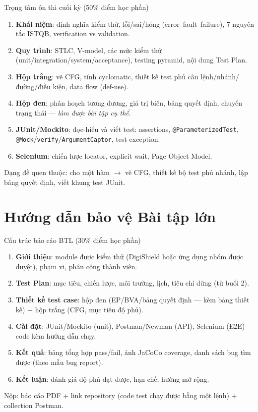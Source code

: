 \documentclass[aspectratio=169,12pt]{beamer}
\begin{document}
\begin{frame}{Trọng tâm ôn thi cuối kỳ (50\% điểm học phần)}
  \vspace*{-0.5em}
  \begin{enumerate}
    \item \textbf{Khái niệm}: định nghĩa kiểm thử, lỗi/sai/hỏng (error--fault--failure), 7 nguyên tắc ISTQB, verification vs validation.
    \item \textbf{Quy trình}: STLC, V-model, các mức kiểm thử (unit/integration/system/acceptance), testing pyramid, nội dung Test Plan.
    \item \textbf{Hộp trắng}: vẽ CFG, tính cyclomatic, thiết kế test phủ câu lệnh/nhánh/đường/điều kiện, data flow (def-use).
    \item \textbf{Hộp đen}: phân hoạch tương đương, giá trị biên, bảng quyết định, chuyển trạng thái --- \emph{làm được bài tập cụ thể}.
    \item \textbf{JUnit/Mockito}: đọc-hiểu và viết test: assertions, \texttt{@ParameterizedTest}, \texttt{@Mock}/\texttt{verify}/\texttt{ArgumentCaptor}, test exception.
    \item \textbf{Selenium}: chiến lược locator, explicit wait, Page Object Model.
  \end{enumerate}
  \small Dạng đề quen thuộc: cho một hàm $\rightarrow$ vẽ CFG, thiết kế bộ test phủ nhánh, lập bảng quyết định, viết khung test JUnit.
\end{frame}

\section{Hướng dẫn bảo vệ Bài tập lớn}

\begin{frame}{Cấu trúc báo cáo BTL (30\% điểm học phần)}
  \begin{enumerate}
    \item \textbf{Giới thiệu}: module được kiểm thử (DigiShield hoặc ứng dụng nhóm được duyệt), phạm vi, phân công thành viên.
    \item \textbf{Test Plan}: mục tiêu, chiến lược, môi trường, lịch, tiêu chí dừng (từ buổi 2).
    \item \textbf{Thiết kế test case}: hộp đen (EP/BVA/bảng quyết định --- kèm bảng thiết kế) + hộp trắng (CFG, mục tiêu độ phủ).
    \item \textbf{Cài đặt}: JUnit/Mockito (unit), Postman/Newman (API), Selenium (E2E) --- code kèm hướng dẫn chạy.
    \item \textbf{Kết quả}: bảng tổng hợp pass/fail, ảnh JaCoCo coverage, danh sách bug tìm được (theo mẫu bug report).
    \item \textbf{Kết luận}: đánh giá độ phủ đạt được, hạn chế, hướng mở rộng.
  \end{enumerate}
  \small Nộp: báo cáo PDF + link repository (code test chạy được bằng một lệnh) + collection Postman.
\end{frame}
\end{document}
